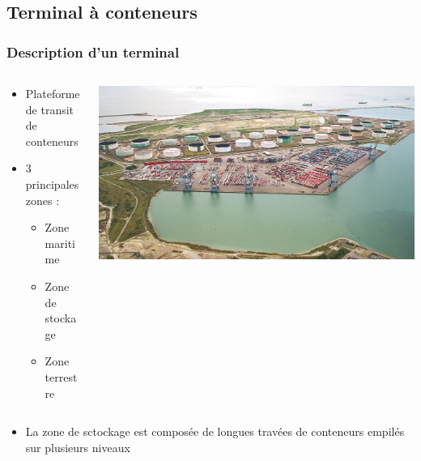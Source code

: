 \documentclass{beamer}
\begin{document}
\subsection*{Terminal à conteneurs}
\begin{frame}
\frametitle{Description d'un terminal}

 	\begin{columns}
 	 	\begin{column}[l]{4.5cm}
			\begin{itemize}
				\item Plateforme de transit de conteneurs
				\item 3 principales zones : 
				\begin{itemize}
 					\item Zone maritime
					\item Zone de stockage
					\item Zone terrestre
				\end{itemize}
			\end{itemize}
		\end{column}
 	 	\begin{column}[r]{7.5cm}
			\begin{flushright}
				\includegraphics[height=.55\textheight]{fig/terminalDeNormandie.jpg}
			\end{flushright}
		\end{column}
 	\end{columns}
\begin{itemize}
\item La zone de sctockage est composée de longues travées de conteneurs empilés sur plusieurs niveaux
\end{itemize}
\end{frame}
\end{document}
